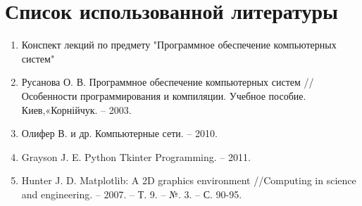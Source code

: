 \section{Список использованной литературы}
\begin{enumerate}
    \item Конспект лекций по предмету "Программное обеспечение компьютерных систем"
    \item Русанова О. В. Программное обеспечение компьютерных систем //Особенности программирования и компиляции. Учебное пособие. Киев,«Корнійчук. – 2003.
    \item Олифер В. и др. Компьютерные сети. – 2010.
    \item Grayson J. E. Python Tkinter Programming. – 2011.
    \item Hunter J. D. Matplotlib: A 2D graphics environment //Computing in science and engineering. – 2007. – Т. 9. – №. 3. – С. 90-95.
\end{enumerate}
